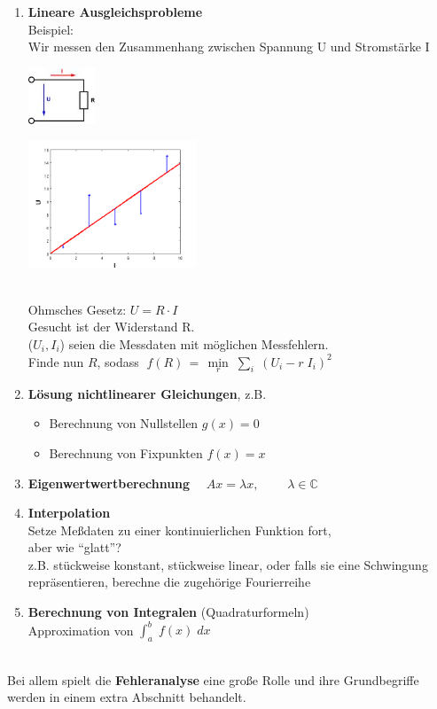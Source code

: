 \begin{enumerate}
\item \textbf{Lineare Ausgleichsprobleme}\\
  Beispiel:\\
  Wir messen den Zusammenhang zwischen Spannung U und
  Stromstärke I\\
  \parbox[c]{3cm}{\includegraphics[width=2cm]{images/ohmsche.jpeg} }
  \parbox[c]{6cm}{\includegraphics[width=5cm]{images/linausgl2.png}} \\
  Ohmsches Gesetz: $U = R \cdot I$\\
  Gesucht ist der Widerstand R. \\
  ($U_i, I_i$) seien die Messdaten mit möglichen Messfehlern.\\
  Finde nun $R$, sodass 
  $\; f(R)\, =\,  \min\limits_r \; \sum\limits_i \; (U_i - r \; I_i)^2$
  
\item \textbf{Lösung nichtlinearer Gleichungen},
  z.B.
  \begin{itemize}
  \item Berechnung von Nullstellen $g(x) = 0$
  \item Berechnung von Fixpunkten $f(x) = x$
  \end{itemize}  
\item \textbf{Eigenwertwertberechnung}
  $\quad Ax= \lambda x, \qquad \; \lambda \in \mathbb{C}$
  
  
\item \textbf{Interpolation}\\
  Setze Meßdaten zu einer kontinuierlichen Funktion fort, \\
  aber wie \enquote{glatt}?\\
  z.B. stückweise konstant, stückweise linear, oder 
  falls sie
  eine Schwingung repräsentieren, berechne die zugehörige
  Fourierreihe  
  
\item \textbf{Berechnung von Integralen} (Quadraturformeln) \\ 
  Approximation von $\int_a^b \; f(x) \; dx$
\end{enumerate}~\\

Bei allem spielt die \textbf{Fehleranalyse} eine große Rolle und
ihre Grundbegriffe werden in einem extra Abschnitt behandelt.
